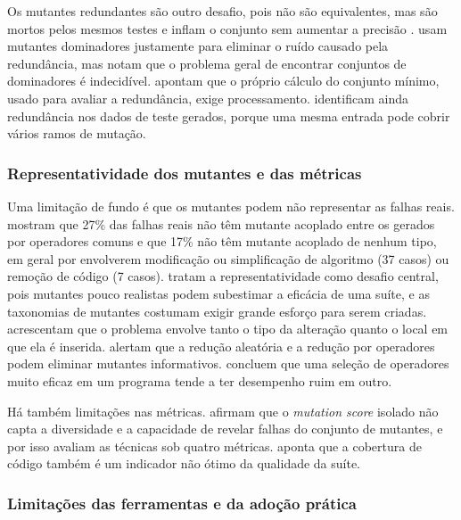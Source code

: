 Os mutantes redundantes são outro desafio, pois não são equivalentes, mas são mortos pelos mesmos testes e inflam o conjunto sem aumentar a precisão \cite{ashong2026}.  usam mutantes dominadores justamente para eliminar o ruído causado pela redundância, mas notam que o problema geral de encontrar conjuntos de dominadores é indecidível.  apontam que o próprio cálculo do conjunto mínimo, usado para avaliar a redundância, exige processamento.  identificam ainda redundância nos dados de teste gerados, porque uma mesma entrada pode cobrir vários ramos de mutação.

\subsubsection{Representatividade dos mutantes e das métricas}
\label{subsubsec:representatividade}

Uma limitação de fundo é que os mutantes podem não representar as falhas reais.  mostram que 27\% das falhas reais não têm mutante acoplado entre os gerados por operadores comuns e que 17\% não têm mutante acoplado de nenhum tipo, em geral por envolverem modificação ou simplificação de algoritmo (37 casos) ou remoção de código (7 casos).  tratam a representatividade como desafio central, pois mutantes pouco realistas podem subestimar a eficácia de uma suíte, e as taxonomias de mutantes costumam exigir grande esforço para serem criadas.  acrescentam que o problema envolve tanto o tipo da alteração quanto o local em que ela é inserida.  alertam que a redução aleatória e a redução por operadores podem eliminar mutantes informativos.  concluem que uma seleção de operadores muito eficaz em um programa tende a ter desempenho ruim em outro.

Há também limitações nas métricas.  afirmam que o \textit{mutation score} isolado não capta a diversidade e a capacidade de revelar falhas do conjunto de mutantes, e por isso avaliam as técnicas sob quatro métricas.  aponta que a cobertura de código também é um indicador não ótimo da qualidade da suíte.

\subsubsection{Limitações das ferramentas e da adoção prática}
\label{subsubsec:limitacoes-ferramentas}

